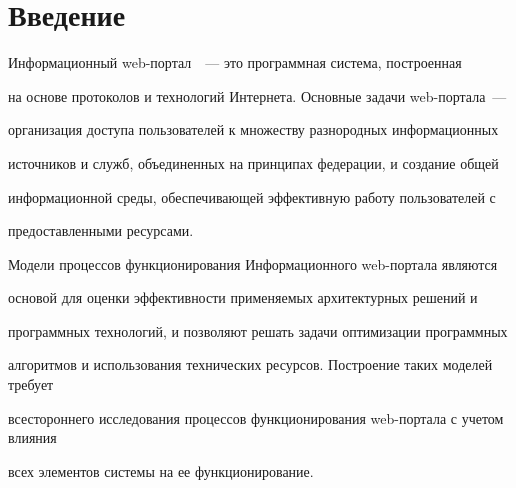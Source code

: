       











 


 \thispagestyle{empty}





\section{Введение}


      


      Информационный web-портал~\cite{1-8}~--- это программная система, построенная 


на основе протоколов и технологий Интернета. Основные задачи web-портала~--- 


организация доступа пользователей к множеству разнородных информационных 


источников и служб, объединенных на принципах федерации, и создание общей 


информационной среды, обеспечивающей эффективную работу пользователей с 


предоставленными ресурсами.


      


      Модели процессов функционирования Информационного web-портала являются 


основой для оценки эффективности при\-ме\-ня\-емых архитектурных решений и 


программных технологий, и позволяют решать задачи оптимизации программных 


алгоритмов и использования технических ресурсов. Построение таких моделей требует 


всестороннего исследования процессов функционирования web-портала с учетом влияния 


всех элементов системы на ее функционирование.


      


